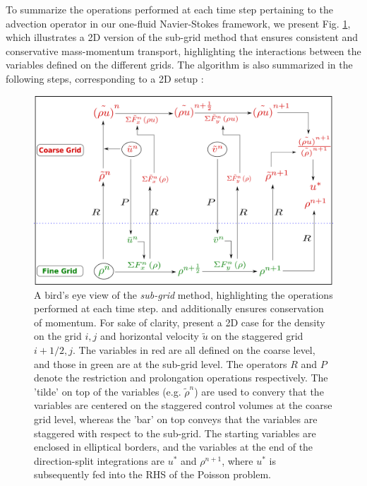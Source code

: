 To summarize the operations performed at each time step
pertaining to the advection operator in our one-fluid Navier-Stokes framework, 
we present Fig. \ref{momcons_sagar}, which illustrates a 2D version 
of the sub-grid method that ensures consistent and conservative 
mass-momentum transport, highlighting the interactions between the 
variables defined on the different grids. The algorithm is also
summarized in the following steps, corresponding to a 2D setup : 


\begin{figure}
\centering
\includegraphics[width = \textwidth]{plots/momcons_sagar.png}
\caption{A bird's eye view of the \textit{sub-grid} method,
highlighting the operations performed at each time step. 
and additionally ensures conservation of momentum.
For sake of clarity, present a 2D case for the
density on the grid $i,j$ and horizontal velocity $\tilde{u}$ 
on the staggered grid $i+1/2,j$.
The variables in red are all defined on the coarse level, 
and those in green are at the sub-grid level. 
The operators $R$ and $P$ denote the restriction and 
prolongation operations respectively.
The 'tilde' on top of the variables (e.g. $\tilde{\rho}^{n} $) are 
used to convery that the variables are centered on the  
staggered control volumes at the coarse grid level, whereas the 'bar' 
on top conveys that the variables are staggered with respect to the sub-grid. 
The starting variables are enclosed in elliptical borders, 
and the variables at the end of the direction-split 
integrations are $u^{*}$ and $\rho^{n+1}$,
where $u^{*}$ is subsequently fed into the RHS of the Poisson problem. 
}
\label{momcons_sagar}
\end{figure}



